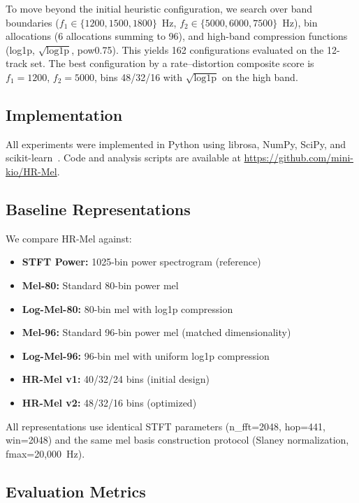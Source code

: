 \documentclass[twocolumn]{article}
\begin{document}
To move beyond the initial heuristic configuration, we search over band boundaries ($f_1 \in \{1200, 1500, 1800\}$~Hz, $f_2 \in \{5000, 6000, 7500\}$~Hz), bin allocations (6 allocations summing to 96), and high-band compression functions (log1p, $\sqrt{\text{log1p}}$, pow0.75). This yields 162 configurations evaluated on the 12-track set. The best configuration by a rate--distortion composite score is $f_1{=}1200$, $f_2{=}5000$, bins 48/32/16 with $\sqrt{\text{log1p}}$ on the high band.

\subsection{Implementation}

All experiments were implemented in Python using librosa, NumPy, SciPy, and scikit-learn~\cite{mcfee2015librosa,harris2020numpy,virtanen2020scipy,sklearn2011}.
Code and analysis scripts are available at \url{https://github.com/mini-kio/HR-Mel}.

\subsection{Baseline Representations}

We compare HR-Mel against:
\begin{itemize}
\item \textbf{STFT Power:} 1025-bin power spectrogram (reference)
\item \textbf{Mel-80:} Standard 80-bin power mel
\item \textbf{Log-Mel-80:} 80-bin mel with log1p compression
\item \textbf{Mel-96:} Standard 96-bin power mel (matched dimensionality)
\item \textbf{Log-Mel-96:} 96-bin mel with uniform log1p compression
\item \textbf{HR-Mel v1:} 40/32/24 bins (initial design)
\item \textbf{HR-Mel v2:} 48/32/16 bins (optimized)
\end{itemize}

All representations use identical STFT parameters (n\_fft=2048, hop=441, win=2048) and the same mel basis construction protocol (Slaney normalization, fmax=20,000~Hz).

\subsection{Evaluation Metrics}
\end{document}
